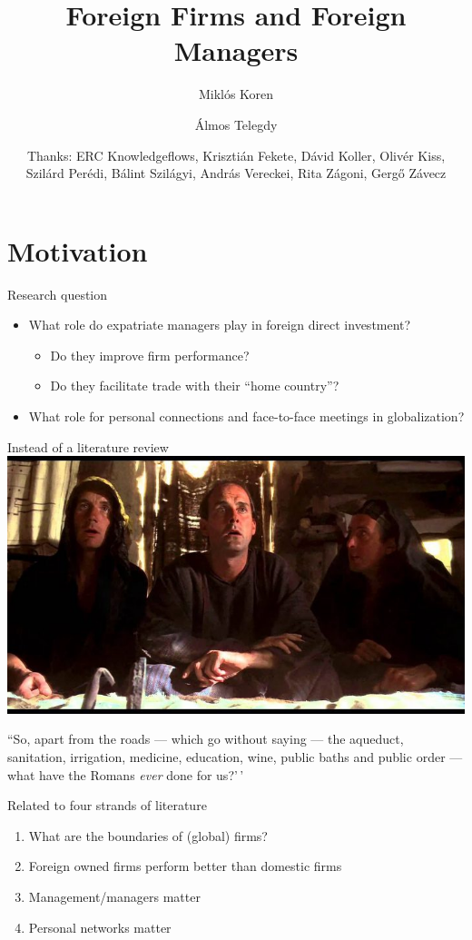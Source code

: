 \documentclass[
  ignorenonframetext,
  aspectratio=43,
]{beamer}
\title{Foreign Firms and Foreign Managers}
\author{Miklós Koren \and Álmos Telegdy}
\date{Thanks: ERC Knowledgeflows, Krisztián Fekete, Dávid Koller, Olivér
Kiss, Szilárd Perédi, Bálint Szilágyi, András Vereckei, Rita Zágoni,
Gergő Závecz}
\providecommand{\tightlist}{%
  \setlength{\itemsep}{0pt}\setlength{\parskip}{0pt}}
\begin{document}
\frame{\titlepage}

\hypertarget{motivation}{%
\section{Motivation}\label{motivation}}

\begin{frame}{Research question}
\protect\hypertarget{research-question}{}
\begin{itemize}
\tightlist
\item
  What role do expatriate managers play in foreign direct investment?

  \begin{itemize}
  \tightlist
  \item
    Do they improve firm performance?
  \item
    Do they facilitate trade with their ``home country''?
  \end{itemize}
\item
  What role for personal connections and face-to-face meetings in
  globalization?
\end{itemize}
\end{frame}

\begin{frame}{Instead of a literature review}
\protect\hypertarget{instead-of-a-literature-review}{}
\includegraphics{figure/Peoples-Front-of-Judea-700x394.jpeg}

``So, apart from the roads --- which go without saying --- the aqueduct,
sanitation, irrigation, medicine, education, wine, public baths and
public order --- what have the Romans \emph{ever} done for us?'\,'
\end{frame}

\begin{frame}{Related to four strands of literature}
\protect\hypertarget{related-to-four-strands-of-literature}{}
\begin{enumerate}
\tightlist
\item
  What are the boundaries of (global) firms?
\item
  Foreign owned firms perform better than domestic firms
\item
  Management/managers matter
\item
  Personal networks matter
\end{enumerate}
\end{frame}
\end{document}
